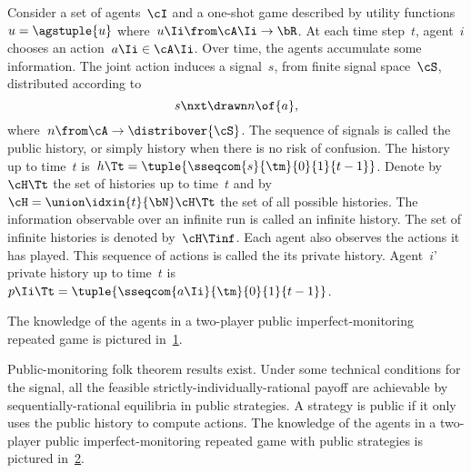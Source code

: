 Consider a set of agents~\(\cI\) and a one-shot game described by utility functions~\(u = \agstuple{u}\) where~\(u\Ii \from \cA\Ii \to \bR \).
At each time step~\(t\), agent~\(i\) chooses an action~\(a\Ii \in \cA\Ii\).
Over time, the agents accumulate some information.
The joint action induces a signal~\(s\), from finite signal space~\(\cS\), distributed according to
\[
s\nxt \drawn n \of{a},
\]
where~\(n \from \cA \to \distribover{\cS}\).
The sequence of signals is called the public history, or simply history when there is no risk of confusion.
The history up to time~\(t\) is~\(h\Tt = \tuple{\sseqcom{s}{\tm}{0}{1}{t-1}}\).
Denote by~\(\cH\Tt\) the set of histories up to time~\(t\) and by~\(\cH = \union\idxin{t}{\bN} \cH\Tt\) the set of all possible histories.
The information observable over an infinite run is called an infinite history.
The set of infinite histories is denoted by~\(\cH\Tinf\).
Each agent also observes the actions it has played.
This sequence of actions is called the its private history.
Agent~\(i\)' private history up to time~\(t\) is~\(p\Ii\Tt = \tuple{\sseqcom{a\Ii}{\tm}{0}{1}{t-1}}\).

The knowledge of the agents in a two-player public imperfect-monitoring repeated game is pictured in~\cref{fig:agent_knowledge_public-monitoring_repeated_game}.

\begin{figure}[htp]
\centering
{}
\label{fig:agent_knowledge_public-monitoring_repeated_game}
\end{figure}


Public-monitoring folk theorem results exist.
Under some technical conditions for the signal, all the feasible strictly-individually-rational payoff are achievable by sequentially-rational equilibria in public strategies.
A strategy is public if it only uses the public history to compute actions.
The knowledge of the agents in a two-player public imperfect-monitoring repeated game with public strategies is pictured in~\cref{fig:agent_knowledge_public-monitoring_repeated_game_public_strategies}.

\begin{figure}[htp]
\centering
{}
\label{fig:agent_knowledge_public-monitoring_repeated_game_public_strategies}
\end{figure}

